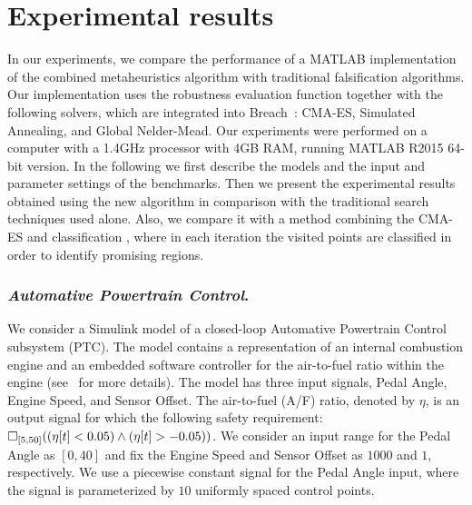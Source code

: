 \section{Experimental results}\label{sec:expres}

In our experiments, we compare the performance of a MATLAB
implementation of the combined metaheuristics algorithm with traditional falsification algorithms. Our implementation uses
the robustness evaluation function together with the following solvers, which are integrated into Breach~\cite{DBLP:conf/cav/Donze10}: CMA-ES, Simulated Annealing, and Global
Nelder-Mead. 
Our experiments were performed on a computer with a 1.4GHz processor with 4GB RAM, running 
MATLAB R2015 64-bit version. 
In the following we first describe the models and the input and parameter settings of the benchmarks. Then we present the experimental results obtained using the new algorithm in comparison with the traditional search techniques used alone. Also, we compare it with a method combining
the CMA-ES and classification \cite{CAV2017}, where in each iteration the visited points are classified in order to identify promising regions.


\subsubsection*{{\em Automative Powertrain Control}.} \label{sec:PTC}
We consider a Simulink model of a closed-loop Automative Powertrain Control
subsystem (PTC). The model contains a representation of an internal combustion engine and an
embedded software controller for the air-to-fuel ratio within the
engine (see~\cite{Dreossi2015} for more details). The model has three input signals,
Pedal Angle, Engine Speed, and Sensor Offset.
The air-to-fuel (A/F) ratio, denoted by $\eta$, is an
output signal for which the following safety requirement: %
$\Box_{[5,50]}( (\eta[t] < 0.05) \land ( \eta[t] > - 0.05 ))$. We consider an input range for
the Pedal Angle as $[0,40]$ and fix the Engine Speed and
Sensor Offset as $1000$ and $1$, respectively. We use  a piecewise constant
signal for the Pedal Angle input, where the signal is parameterized by $10$
uniformly spaced control points.  

